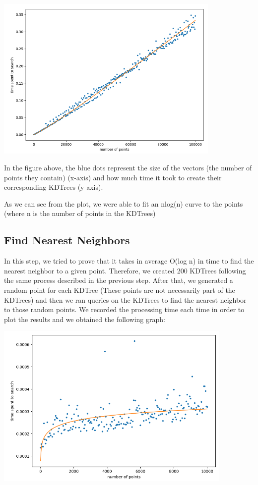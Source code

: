 \documentclass[]{article}
\begin{document}
		{\centering
			\includegraphics[width=\textwidth, height=8cm,keepaspectratio]{create_KDTree.png}
			
	  \par}
  		In the figure above, the blue dots represent the size of the vectors (the number of points they contain) (x-axis) and how much time it took to create their corresponding KDTrees (y-axis).
  		
  		As we can see from the plot, we were able to fit an nlog(n) curve to the points (where n is the number of points in the KDTrees) 
  		
  	\subsection{Find Nearest Neighbors}
  	
  		In this step, we tried to prove that it takes in average O(log n) in time to find the nearest neighbor to a given point. Therefore, we created 200 KDTrees following the same process described in the previous step. After that, we generated a random point for each KDTree (These points are not necessarily part of the KDTrees) and then we ran queries on the KDTrees to find the nearest neighbor to those random points. We recorded the processing time each time in order to plot the results and we obtained the following graph:
  		
  		{\centering
  			\includegraphics[width=\textwidth, height=8cm,keepaspectratio]{nearest_n.png}
  			
  			\par}
  		
\end{document}
